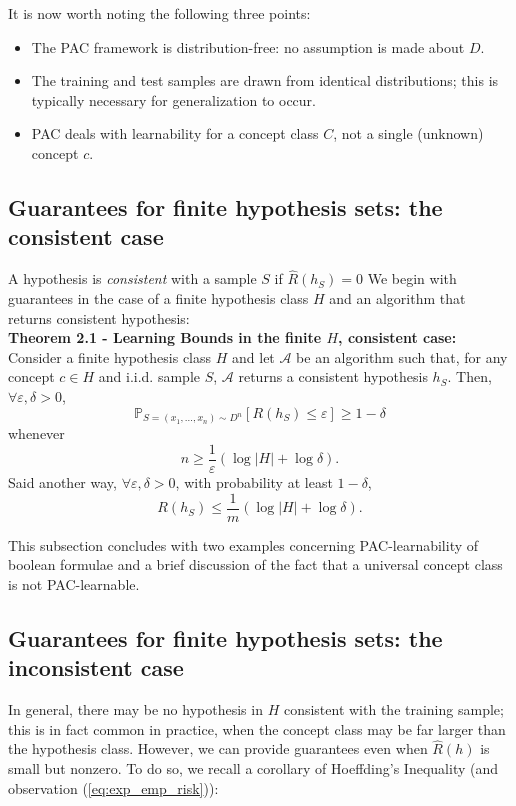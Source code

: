 \documentclass{article} %
\newcommand{\e}{\varepsilon}                        %
\newcommand{\A}{\mathcal{A}}                        %
\newcommand{\pr}{\mathbb{P}}                        %
\renewcommand{\hat}{\widehat}
\begin{document}
It is now worth noting the following three points:
\begin{itemize}
\item The PAC framework is distribution-free: no assumption is made about $D$.
\item The training and test samples are drawn from identical distributions;
this is typically necessary for generalization to occur.
\item PAC deals with learnability for a concept class $C$, not a single
(unknown) concept $c$.
\end{itemize}

\subsection{Guarantees for finite hypothesis sets: the consistent case}
A hypothesis is \emph{consistent} with a sample $S$ if $\hat R(h_S) = 0$
We begin with guarantees in the case of a finite hypothesis class $H$ and an
algorithm that returns consistent hypothesis:\\

{\bf Theorem 2.1 - Learning Bounds in the finite $H$, consistent case:}
Consider a finite hypothesis class $H$ and let $\A$ be an algorithm such that,
for any concept $c \in H$ and i.i.d. sample $S$, $\A$ returns a consistent
hypothesis $h_S$. Then, $\forall \e, \delta > 0$,
\[\pr_{S = (x_1,\dots,x_n) \sim D^n}\left[ R(h_S) \leq \e \right]
    \geq 1 - \delta\]
whenever
\[n \geq \frac1\e \left( \log|H| + \log \delta \right).\]
Said another way, $\forall \e, \delta > 0$, with probability at least
$1 - \delta$,
\[R(h_S) \leq \frac1m \left( \log|H| + \log \delta \right).\]

This subsection concludes with two examples concerning PAC-learnability of
boolean formulae and a brief discussion of the fact that a universal concept
class is not PAC-learnable.

\subsection{Guarantees for finite hypothesis sets: the inconsistent case}
In general, there may be no hypothesis in $H$ consistent with the training
sample; this is in fact common in practice, when the concept class may be far
larger than the hypothesis class. However, we can provide guarantees even when
$\hat R(h)$ is small but nonzero. To do so, we recall a corollary of
Hoeffding's Inequality (and observation (\ref{eq:exp_emp_risk})):\\
\end{document}
